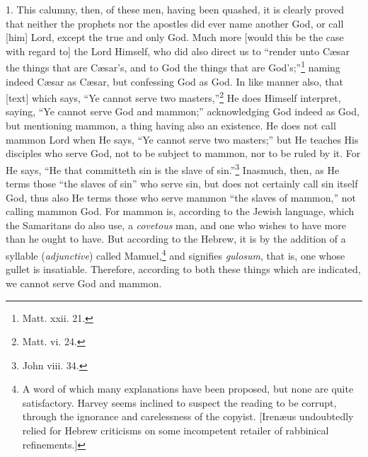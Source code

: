 
1. This calumny, then, of these men, having been quashed, it is clearly proved that neither the prophets nor the apostles did ever name another God, or call [him] Lord, except the true and only God. Much more [would this be the case with regard to] the Lord Himself, who did also direct us to “render unto Cæsar the things that are Cæsar’s, and to God the things that are God’s;”\footnote{Matt. xxii. 21.} naming indeed Cæsar as Cæsar, but confessing God as God. In like manner also, that [text] which says, “Ye cannot serve two masters,”\footnote{Matt. vi. 24.} He does Himself interpret, saying, “Ye cannot serve God and mammon;” acknowledging God indeed as God, but mentioning mammon, a thing having also an existence. He does not call mammon Lord when He says, “Ye cannot serve two masters;” but He teaches His disciples who serve God, not to be subject to mammon, nor to be ruled by it. For He says, “He that committeth sin is the slave of sin.”\footnote{John viii. 34.} Inasmuch, then, as He terms those “the slaves of sin” who serve sin, but does not certainly call sin itself God, thus also He terms those who serve mammon “the slaves of mammon,” not calling mammon God. For mammon is, according to the Jewish language, which the Samaritans do also use, a \emph{covetous} man, and one who wishes to have more than he ought to have. But according to the Hebrew, it is by the addition of a syllable (\emph{adjunctive}) called Mamuel,\footnote{A word of which many explanations have been proposed, but none are quite satisfactory. Harvey seems inclined to suspect the reading to be corrupt, through the ignorance and carelessness of the copyist. [Irenæus undoubtedly relied for Hebrew criticisms on some incompetent retailer of rabbinical refinements.]} and signifies \emph{gulosum}, that is, one whose gullet is insatiable. Therefore, according to both these things which are indicated, we cannot serve God and mammon.

